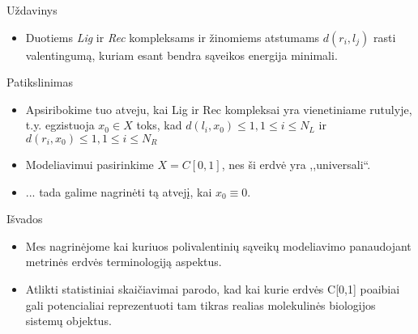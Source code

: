 \documentclass[11pt]{beamer}
\begin{document}

\begin{frame}{Uždavinys}
\begin{itemize}
\item Duotiems \textit{Lig} ir \textit{Rec} kompleksams ir žinomiems atstumams $d(r_i, l_j)$ rasti valentingumą, kuriam esant bendra sąveikos energija minimali.

\end{itemize}
\end{frame}



\begin{frame}{Patikslinimas}
\begin{itemize}
\item Apsiribokime tuo atveju, kai Lig ir Rec kompleksai yra vienetiniame rutulyje, t.y. 
egzistuoja $x_0 \in X$ toks, kad $d(l_i, x_0) \leqslant 1, 1 \leqslant i \leqslant N_L $  ir 
$d(r_i, x_0) \leqslant 1, 1 \leqslant i \leqslant N_R$
\item Modeliavimui pasirinkime $X = C[0,1]$, nes ši erdvė yra ,,universali``.
\item ... tada  galime nagrinėti tą atvejį, kai $x_0 \equiv 0$. 


\end{itemize}
\end{frame}

\begin{frame}{Išvados}
\begin{itemize}
\item Mes nagrinėjome kai kuriuos polivalentinių sąveikų modeliavimo panaudojant metrinės erdvės terminologiją aspektus. 
\item Atlikti statistiniai skaičiavimai parodo, kad kai kurie erdvės C[0,1] poaibiai gali  potencialiai reprezentuoti tam  tikras realias molekulinės biologijos sistemų objektus. 


\end{itemize}
\end{frame}
\end{document}

